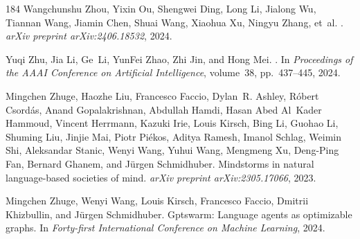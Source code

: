\begin{thebibliography}{184}
Wangchunshu Zhou, Yixin Ou, Shengwei Ding, Long Li, Jialong Wu, Tiannan Wang,
  Jiamin Chen, Shuai Wang, Xiaohua Xu, Ningyu Zhang, et~al.
.
\newblock \emph{arXiv preprint arXiv:2406.18532}, 2024.

Yuqi Zhu, Jia Li, Ge~Li, YunFei Zhao, Zhi Jin, and Hong Mei.
.
\newblock In \emph{Proceedings of the AAAI Conference on Artificial
  Intelligence}, volume~38, pp.\  437--445, 2024.

Mingchen Zhuge, Haozhe Liu, Francesco Faccio, Dylan~R. Ashley, R{\'o}bert
  Csord{\'a}s, Anand Gopalakrishnan, Abdullah Hamdi, Hasan Abed Al~Kader
  Hammoud, Vincent Herrmann, Kazuki Irie, Louis Kirsch, Bing Li, Guohao Li,
  Shuming Liu, Jinjie Mai, Piotr Pi{\'e}kos, Aditya Ramesh, Imanol Schlag,
  Weimin Shi, Aleksandar Stanic, Wenyi Wang, Yuhui Wang, Mengmeng Xu, Deng-Ping
  Fan, Bernard Ghanem, and J{\"u}rgen Schmidhuber.
\newblock Mindstorms in natural language-based societies of mind.
\newblock \emph{arXiv preprint arXiv:2305.17066}, 2023.

Mingchen Zhuge, Wenyi Wang, Louis Kirsch, Francesco Faccio, Dmitrii Khizbullin,
  and J{\"u}rgen Schmidhuber.
\newblock Gptswarm: Language agents as optimizable graphs.
\newblock In \emph{Forty-first International Conference on Machine Learning},
  2024.

\end{thebibliography}
